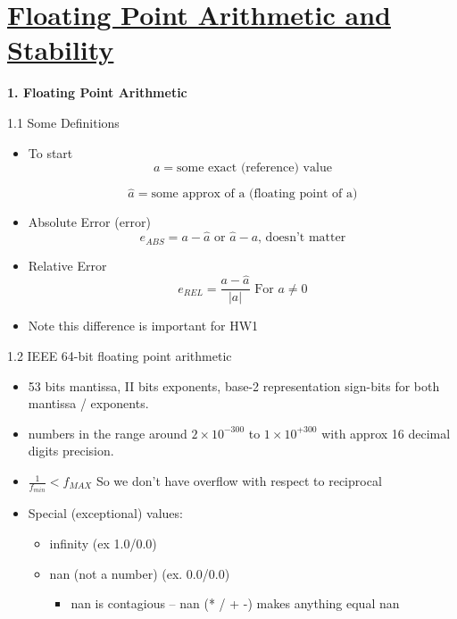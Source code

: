\def \secname {Floating Point Arithmetic and Stability}

\section[\secname]{\hyperlink{toc}{\secname}}

\textbf{1. Floating Point Arithmetic}

1.1 Some Definitions
\begin{itemize}
    \item To start
    \[ a = \text{some exact (reference) value}\]

    \[\hat{a} = \text{some approx of a (floating point of a)}  \]

    \item Absolute Error (error)
    \[ e_{ABS} = a - \hat{a} \text{ or }\hat{a}-a \text{, doesn't matter}\]
    \item Relative Error 
    \[e_{REL} = \frac{a-\hat{a}}{|a|} \text{ For } a \neq 0 \]

    \item Note this difference is important for HW1
\end{itemize}



1.2 IEEE 64-bit floating point arithmetic
\begin{itemize}
    \item 53 bits mantissa, II bits exponents, base-2 representation sign-bits for both mantissa / exponents.

    \item numbers in the range around $2\times 10^{-300}$ to $1\times 10^{+300}$ with approx 16 decimal digits precision.

    \item $\frac{1}{f_{min}} < f_{MAX} $ So we don't have overflow with respect to reciprocal
    \item Special (exceptional) values:
    \begin{itemize}
        \item infinity (ex 1.0/0.0)
        \item nan (not a number) (ex. 0.0/0.0)
        \begin{itemize}
            \item nan is contagious -- nan (* / + -) makes anything equal nan
        \end{itemize}
    \end{itemize}
\end{itemize}

